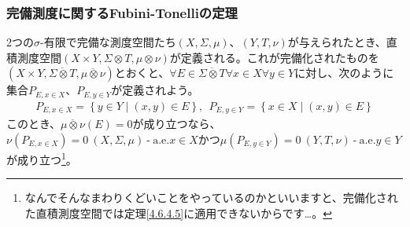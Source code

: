 \documentclass[dvipdfmx]{jsarticle}
\begin{document}
\subsubsection{完備測度に関するFubini-Tonelliの定理}%
\begin{thm}\label{4.6.4.6}
2つの$\sigma$-有限で完備な測度空間たち$(X,\varSigma,\mu)$、$(Y,T,\nu)$が与えられたとき、直積測度空間$(X \times Y, \varSigma \otimes T, \mu \otimes \nu)$が定義される。これが完備化されたものを$\left( X \times Y, \overline{\varSigma \otimes T},\overline{\mu \otimes \nu} \right)$とおくと、$\forall E \in \overline{\varSigma \otimes T}\forall x \in X\forall y \in Y$に対し、次のように集合$P_{E,x \in X}$、$P_{E,y \in Y}$が定義されよう。
\begin{align*}
P_{E,x \in X} = \left\{ y \in Y \middle| (x,y) \in E \right\},\ \ P_{E,y \in Y} = \left\{ x \in X \middle| (x,y) \in E \right\}
\end{align*}
このとき、$\overline{\mu \otimes \nu}(E) = 0$が成り立つなら、$\nu\left( P_{E,x \in X} \right) = 0\ (X,\varSigma,\mu) \ \text{-} \ \mathrm{a.e.}x \in X$かつ$\mu\left( P_{E,y \in Y} \right) = 0\ (Y,T,\nu) \ \text{-} \ \mathrm{a.e.}y \in Y$が成り立つ\footnote{なんでそんなまわりくどいことをやっているのかといいますと、完備化された直積測度空間では定理\ref{4.6.4.5}に適用できないからです…。}。
\end{thm}
\end{document}
